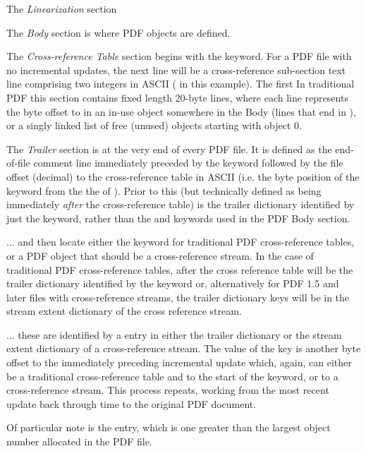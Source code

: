 The \emph{Linearization} section

The \emph{Body} section is where PDF objects are defined.

The \emph{Cross-reference Table} section begins with the  keyword. For a PDF file
with no incremental updates, the next line will be a cross-reference sub-section text line comprising
two integers in ASCII ( in this example). The first 
In traditional PDF this section contains fixed length 20-byte lines, where each line
represents the byte offset to in an in-use object somewhere in the Body (lines that end in
), or a singly linked list of free (unused) objects starting with object 0.  

The \emph{Trailer} section is at the very end of every PDF file. 
It is defined as the end-of-file comment line  immediately
preceded by the  keyword followed by the file offset (decimal) to 
the cross-reference table in ASCII (i.e. the byte position of the  keyword 
from the the \lstcd{\%} of ). Prior to this (but technically 
defined as being immediately \emph{after} the cross-reference table) is the trailer dictionary
identified by just the  keyword, rather than the  and 
keywords used in the PDF Body section.


... and then locate either the  keyword for
traditional PDF cross-reference tables, or a PDF object that should be
a cross-reference stream.  In the case of traditional PDF
cross-reference tables, after the cross reference table will be the
trailer dictionary identified by the  keyword or,
alternatively for PDF 1.5 and later files with cross-reference
streams, the trailer dictionary keys will be in the stream extent
dictionary of the cross reference stream.

... these are identified by a  entry in either the trailer
dictionary or the stream extent dictionary of a cross-reference stream. The
value of the  key is another byte offset to the immediately
preceding incremental update which, again, can either be a traditional
cross-reference table and to the start of the  keyword, or to a
cross-reference stream. This process repeats, working from the most recent
update back through time to the original PDF document.

Of particular note is the  entry, which
is one greater than the largest object number allocated in the PDF
file.

